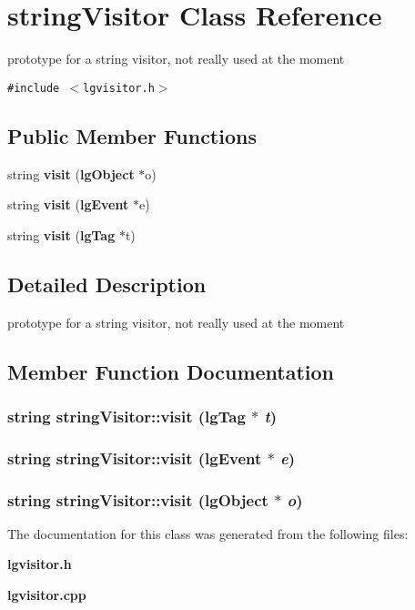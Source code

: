 \section{string\-Visitor Class Reference}
\label{classstringVisitor}
prototype for a string visitor, not really used at the moment  


{\tt \#include $<$lgvisitor.h$>$}

\subsection*{Public Member Functions}
\begin{CompactItemize}
\item 
string {\bf visit} ({\bf lg\-Object} $\ast$o)
\item 
string {\bf visit} ({\bf lg\-Event} $\ast$e)
\item 
string {\bf visit} ({\bf lg\-Tag} $\ast$t)
\end{CompactItemize}


\subsection{Detailed Description}
prototype for a string visitor, not really used at the moment 



\subsection{Member Function Documentation}
\subsubsection{\setlength{\rightskip}{0pt plus 5cm}string string\-Visitor::visit ({\bf lg\-Tag} $\ast$ {\em t})}\label{classstringVisitor_a2}


\subsubsection{\setlength{\rightskip}{0pt plus 5cm}string string\-Visitor::visit ({\bf lg\-Event} $\ast$ {\em e})}\label{classstringVisitor_a1}


\subsubsection{\setlength{\rightskip}{0pt plus 5cm}string string\-Visitor::visit ({\bf lg\-Object} $\ast$ {\em o})}\label{classstringVisitor_a0}




The documentation for this class was generated from the following files:\begin{CompactItemize}
\item 
{\bf lgvisitor.h}\item 
{\bf lgvisitor.cpp}\end{CompactItemize}
